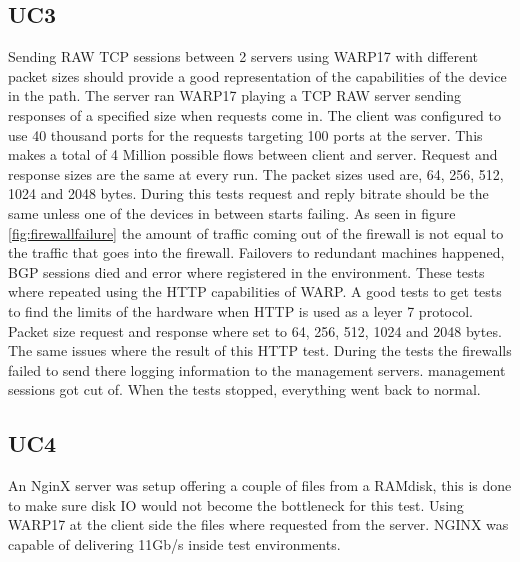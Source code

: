 \subsection{UC3}
Sending RAW TCP sessions between 2 servers using WARP17 with different packet sizes should provide a good representation of the capabilities of the device in the path. 
The server ran WARP17 playing a TCP RAW server sending responses of a specified size when requests come in. The client was configured to use 40 thousand ports for the requests targeting 100 ports at the server. This makes a total of 4 Million possible flows between client and server. Request and response sizes are the same at every run. The packet sizes used are, 64, 256, 512, 1024 and 2048 bytes.
During this tests request and reply bitrate should be the same unless one of the devices in between starts failing. As seen in figure \ref{fig:firewallfailure} the amount of traffic coming out of the firewall is not equal to the traffic that goes into the firewall. Failovers to redundant machines happened, BGP sessions died and error where registered in the environment. 
These tests where repeated using the HTTP capabilities of WARP. A good tests to get tests to find the limits of the hardware when HTTP is used as a leyer 7 protocol. Packet size request and response where set to 64, 256, 512, 1024 and 2048 bytes. The same issues where the result of this HTTP test. During the tests the firewalls failed to send there logging information to the management servers. management sessions got cut of. When the tests stopped, everything went back to normal. 

\subsection{UC4}
An NginX server was setup offering a couple of files from a RAMdisk, this is done to make sure disk IO would not become the bottleneck for this test. Using WARP17 at the client side the files where requested from the server. NGINX was capable of delivering 11Gb/s inside test environments.

\


 


